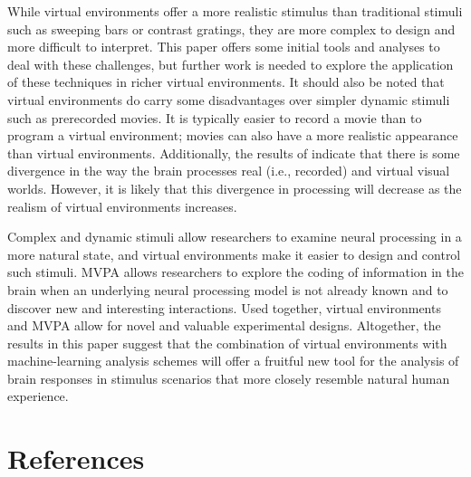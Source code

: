 \documentclass[5p,authoryear]{elsarticle}
\begin{document}
While virtual environments offer a more realistic stimulus than traditional stimuli such as sweeping bars or contrast gratings, they are more complex to design and more difficult to interpret.
This paper offers some initial tools and analyses to deal with these challenges, but further work is needed to explore the application of these techniques in richer virtual environments.
It should also be noted that virtual environments do carry some disadvantages over simpler dynamic stimuli such as prerecorded movies. 
It is typically easier to record a movie than to program a virtual environment; movies can also have a more realistic appearance than virtual environments.
Additionally, the results of \cite{Han2005} indicate that there is some divergence in the way the brain processes real (i.e., recorded) and virtual visual worlds. 
However, it is likely that this divergence in processing will decrease as the realism of virtual environments increases.

Complex and dynamic stimuli allow researchers to examine neural processing in a more natural state, and virtual environments make it easier to design and control such stimuli.
MVPA allows researchers to explore the coding of information in the brain when an underlying neural processing model is not already known and to discover new and interesting interactions.
Used together, virtual environments and MVPA allow for novel and valuable experimental designs.
Altogether, the results in this paper suggest that the combination of virtual environments with machine-learning analysis schemes will offer a fruitful new tool for the analysis of brain responses in stimulus scenarios that more closely resemble natural human experience.

\section{References}

\end{document}
